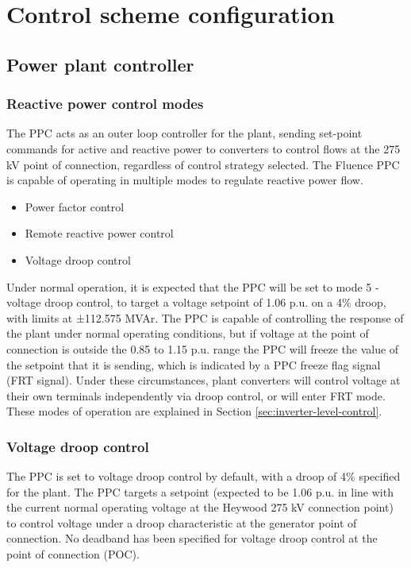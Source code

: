 \documentclass{../grid-link-report}
\begin{document}
	
	\section{Control scheme configuration}
	
	\subsection{Power plant controller}
	
	\subsubsection{Reactive power control modes}
	
	The \ac{PPC} acts as an outer loop controller for the plant, sending set-point commands for active and reactive power to converters to control flows at the 275 kV point of connection, regardless of control strategy selected. The Fluence PPC is capable of operating in multiple modes to regulate reactive power flow.
	
	\begin{itemize}
		\item Power factor control
		\item Remote reactive power control
		\item Voltage droop control
	\end{itemize}
	
	Under normal operation, it is expected that the PPC will be set to mode 5 - voltage droop control, to target a voltage setpoint of 1.06 p.u. on a 4\% droop, with limits at ±112.575 MVAr. The PPC is capable of controlling the response of the plant under normal operating conditions, but if voltage at the point of connection is outside the 0.85 to 1.15 p.u. range the PPC will freeze the value of the setpoint that it is sending, which is indicated by a PPC freeze flag signal (FRT signal). Under these circumstances, plant converters will control voltage at their own terminals independently via droop control, or will enter FRT mode. These modes of operation are explained in Section \ref{sec:inverter-level-control}.
	
	
	\subsubsection{Voltage droop control}
	
	The PPC is set to voltage droop control by default, with a droop of 4\% specified for the plant. The PPC targets a setpoint (expected to be 1.06 p.u. in line with the current normal operating voltage at the Heywood 275 kV connection point) to control voltage under a droop characteristic at the generator point of connection. No deadband has been specified for voltage droop control at the point of connection (POC).
	
\end{document}

